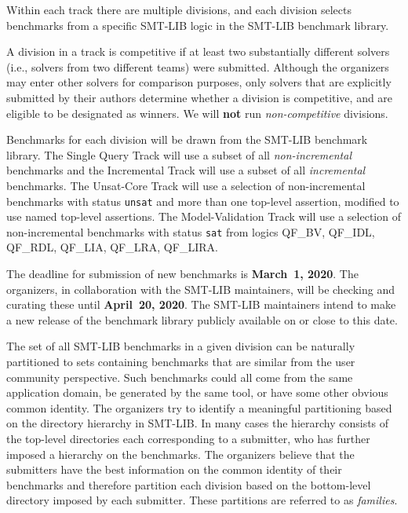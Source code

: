 \documentclass[12pt]{article}
\newcommand{\maintrack}{Single Query Track\xspace}
\newcommand{\inctrack}{Incremental Track\xspace}
\newcommand{\ucoretrack}{Unsat-Core Track\xspace}
\newcommand{\mvaltrack}{Model-Validation Track\xspace}
\newcommand{\challtrack}{Industry-Challenge Track\xspace}
\begin{document}
Within each track there are multiple divisions, and each division selects
benchmarks from a specific SMT-LIB logic in the SMT-LIB benchmark library.

A division in a track is competitive if at least two substantially
different solvers (i.e., solvers from two different teams) were
submitted.  Although the organizers may enter other solvers for
comparison purposes, only solvers that are explicitly submitted by
their authors determine whether a division is competitive, and are
eligible to be designated as winners.
We will \textbf{not} run \emph{non-competitive} divisions.

Benchmarks for each division will be drawn from the SMT-LIB benchmark library.
The \maintrack will use a subset of all \emph{non-incremental} benchmarks and
the \inctrack will use a subset of all \emph{incremental} benchmarks.
%
%
The \ucoretrack will use a selection of
non-incremental benchmarks with status \texttt{unsat} and more than one
top-level assertion, modified to use named top-level assertions.  The
\mvaltrack will use a selection of non-incremental benchmarks with status
\texttt{sat} from logics QF\_BV, QF\_IDL, QF\_RDL, QF\_LIA, QF\_LRA, QF\_LIRA.

The deadline for submission of new benchmarks is {\bf March~1, 2020}.
The organizers, in collaboration with the SMT-LIB maintainers, will be
checking and curating these until {\bf April~20, 2020}.  The SMT-LIB
maintainers intend to make a new release of the benchmark library
publicly available on or close to this date.

The set of all SMT-LIB benchmarks in a given division can be naturally
partitioned to sets containing benchmarks that are similar from the user
community perspective.  Such benchmarks could all come from the same
application domain, be generated by the same tool, or have some other
obvious common identity.
%
The organizers try to identify a meaningful partitioning based on the
directory hierarchy in SMT-LIB.  In many cases the hierarchy consists of
the top-level directories each corresponding to a submitter, who has
further imposed a hierarchy on the benchmarks.
%
The organizers believe that the submitters have the best information on
the common identity of their benchmarks and therefore partition each
division based on the bottom-level directory imposed by each submitter.
These partitions are referred to as \emph{families}.
\end{document}
